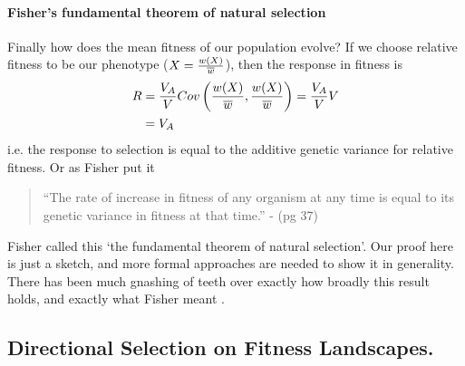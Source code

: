 
\paragraph{Fisher's fundamental theorem of natural selection} 
Finally how does the mean fitness of our population evolve? 
If we choose relative fitness to be our phenotype
  ($X=\frac{w(X)}{\overline{w}}$), then the response in fitness is
\begin{align}
  R &= \frac{V_A}{V}  Cov \left(\frac{w(X)}{\overline{w}} ,
  \frac{w(X)}{\overline{w}} \right) = \frac{V_A}{V} V \nonumber\\
  &=V_A
\end{align}
i.e. the response to selection is equal to the additive genetic
variance for relative fitness. Or as Fisher put it
\begin{quote}
``The rate of increase in fitness of any organism at any time is equal
to its genetic variance in fitness at that time.'' -\citet{fisher1930} (pg 37)
\end{quote}
Fisher called this `the fundamental theorem of natural
selection'. Our proof here is just a sketch, and more formal
approaches are needed to show it in generality. There has been much gnashing of teeth over exactly how broadly this result holds, and exactly what
Fisher meant \citep[see ][ for a recent overview]{ewens2010gene}. 

\subsection{Directional Selection on Fitness Landscapes.}  \label{section:pheno_fitness_landscapes}

